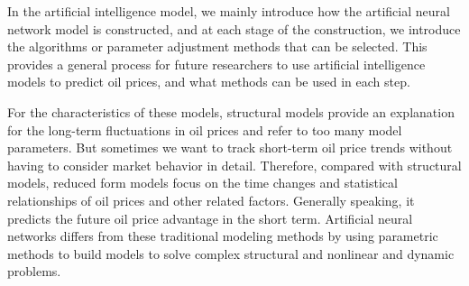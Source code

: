 In the artificial intelligence model, we mainly introduce how the artificial neural network model is constructed, and at each stage of the construction, we introduce the algorithms or parameter adjustment methods that can be selected. This provides a general process for future researchers to use artificial intelligence models to predict oil prices, and what methods can be used in each step.

For the characteristics of these models, structural models provide an explanation for the long-term fluctuations in oil prices and refer to too many model parameters. But sometimes we want to track short-term oil price trends without having to consider market behavior in detail. Therefore, compared with structural models, reduced form models focus on the time changes and statistical relationships of oil prices and other related factors. Generally speaking, it predicts the future oil price advantage in the short term. Artificial neural networks differs from these traditional modeling methods by using parametric methods to build models to solve complex structural and nonlinear and dynamic problems.

